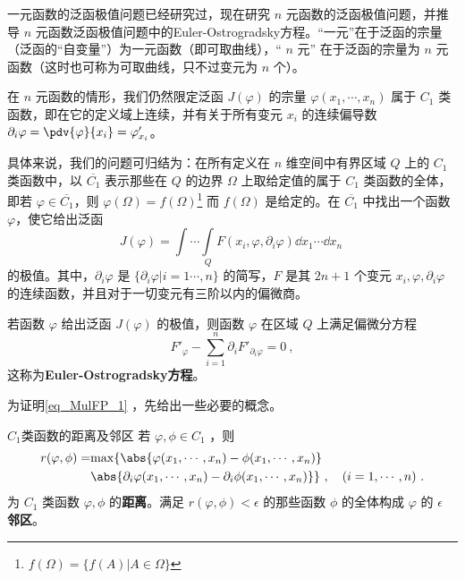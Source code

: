 一元函数的泛函极值问题已经研究过，现在研究 $n$ 元函数的泛函极值问题，并推导 $n$ 元函数泛函极值问题中的Euler-Ostrogradsky方程。“一元”在于泛函的宗量（泛函的“自变量”）为一元函数（即可取曲线），“ $n$ 元” 在于泛函的宗量为 $n$ 元函数（这时也可称为可取曲线，只不过变元为 $n$ 个）。

在 $n$ 元函数的情形，我们仍然限定泛函 $J(\varphi)$ 的宗量 $\varphi(x_1,\cdots,x_n)$ 属于 $C_1$ 类函数，即在它的定义域上连续，并有关于所有变元 $x_i$ 的连续偏导数 $\partial_i\varphi=\pdv{\varphi}{x_i}=\varphi'_{x_i}$。

具体来说，我们的问题可归结为：在所有定义在 $n$ 维空间中有界区域 $Q$ 上的 $C_1$ 类函数中，以 $\overline{C_1}$ 表示那些在 $Q$ 的边界 $\Omega$ 上取给定值的属于 $C_1$ 类函数的全体，即若 $\varphi\in\overline{C_1}$，则 $\varphi(\Omega)=f(\Omega)$\footnote{$f(\Omega)=\{f(A)|A\in \Omega\}$} 而 $f(\Omega)$ 是给定的。在 $\overline{C_1}$ 中找出一个函数 $\varphi$，使它给出泛函
\begin{equation}
J(\varphi)=\int\cdots\int\limits_Q F(x_i,\varphi,\partial_i\varphi)\dd x_1\cdots\dd x_n~
\end{equation}
的极值。其中，$\partial_i\varphi$ 是 $\{\partial_i\varphi|i=1\cdots,n\}$ 的简写，$F$ 是其 $2n+1$ 个变元 $x_i,\varphi,\partial_i\varphi$ 的连续函数，并且对于一切变元有三阶以内的偏微商。

若函数 $\varphi$ 给出泛函 $J(\varphi)$ 的极值，则函数 $\varphi$ 在区域 $Q$ 上满足偏微分方程
\begin{equation}\label{eq_MulFP_1}
F'_\varphi-\sum_{i=1}^n\partial_i F'_{\partial_i\varphi}=0~,
\end{equation}
这称为\textbf{Euler-Ostrogradsky方程}。

为证明\autoref{eq_MulFP_1} ，先给出一些必要的概念。
\begin{definition}{$C_1$类函数的距离及邻区}
若 $\varphi,\phi\in C_1$ ，则
\begin{equation}
\begin{aligned}
r(\varphi,\phi)=&\mathrm{max}\{\abs{\varphi(x_1,\cdots,x_n)-\phi(x_1,\cdots,x_n)}\\
&\abs{\partial_i\varphi(x_1,\cdots,x_n)-\partial_i\phi(x_1,\cdots,x_n)}\}~,\quad (i=1,\cdots,n)~.
\end{aligned}
\end{equation}
为 $C_1$ 类函数 $\varphi,\phi$ 的\textbf{距离}。满足 $r(\varphi,\phi)<\epsilon$ 的那些函数 $\phi$ 的全体构成 $\varphi$ 的 $\epsilon$ \textbf{邻区}。 
\end{definition}
